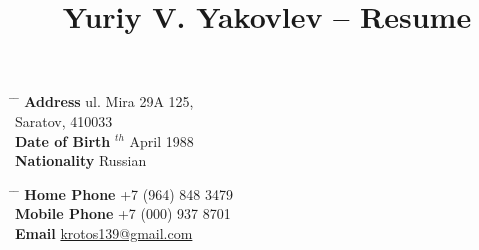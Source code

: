 

\title{Yuriy V. Yakovlev -- Resume} %


\parbox{0.5\textwidth}{ %
\begin{tabbing} %
\hspace{3cm} \= \hspace{4cm} \= \kill %
{\bf Address} \> ul. Mira 29A 125,\\ %
\> Saratov, 410033 \\ %
{\bf Date of Birth} $^{th}$ April 1988 \\ %
{\bf Nationality} \> Russian %
\end{tabbing}}
\hfill %
\parbox{0.5\textwidth}{ %
\begin{tabbing} %
\hspace{3cm} \= \hspace{4cm} \= \kill %
{\bf Home Phone} \> +7 (964) 848 3479 \\ %
{\bf Mobile Phone} \> +7 (000) 937 8701 \\ %
{\bf Email} \> \href{mailto:krotos139@gmail.com}{krotos139@gmail.com} \\ %
\end{tabbing}}


%


